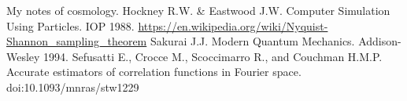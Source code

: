 \begin{thebibliography}{9}
 My notes of cosmology.
 Hockney R.W. \& Eastwood J.W. 
Computer Simulation Using Particles. IOP 1988.
\url{https://en.wikipedia.org/wiki/Nyquist-Shannon_sampling_theorem}
 Sakurai J.J. Modern Quantum Mechanics. Addison-Wesley 1994.
 Sefusatti E., Crocce M., Scoccimarro R., 
and Couchman H.M.P. Accurate estimators of correlation functions in Fourier space.
doi:10.1093/mnras/stw1229
\end{thebibliography}

